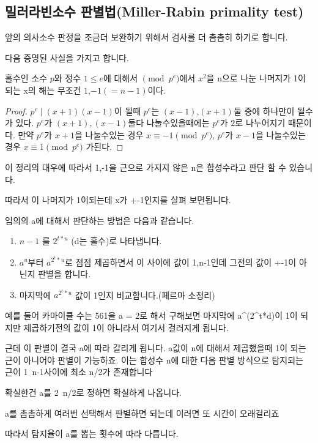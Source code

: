 \subsection{밀러라빈소수 판별법(Miller-Rabin primality test)}

앞의 의사소수 판정을 조금더 보완하기 위해서 검사를 더 촘촘히 하기로 합니다.

다음 증명된 사실을 가지고 합니다.

\begin{theorem}
    홀수인 소수 $p$와 정수 $1 \le e$에 대해서 $\pmod{p^e} $에서 $x^2$을 n으로 나눈 나머지가 1이 되는 x의 해는 무조건 $1$,$-1(=n-1)$이다.
\end{theorem}

\begin{proof}
    $p^e \mid (x+1)(x-1)$이 될때 $p^e$는 $(x-1)$,$(x+1)$둘 중에 하나만이 될수가 있다. $p^e$가 $(x+1), (x-1)$둘다 나눌수있을때에는 $p^e$가 $2$로 나누어지기 때문이다. 만약 $p^e$가 $x+1$을 나눌수있는 경우 $x \equiv -1 \pmod{p^e}$, $p^e$가 $x-1$을 나눌수있는 경우 $x \equiv 1 \pmod{p^e}$ 
    가된다.
\end{proof}
이 정리의 대우에 따라서 1,-1을 근으로 가지지 않은 n은 합성수라고 판단 할 수 있습니다.

따라서 이 나머지가 1이되는데 x가 +-1인지를 살펴 보면됩니다.

임의의 a에 대해서 판단하는 방법은 다음과 같습니다.
\begin{enumerate}
    \item $n-1$ 를  $2^{t*u}$ (d는 홀수)로 나타냅니다.
    \item $a^u$부터 $a^{2^t*u}$로 점점 제곱하면서 이 사이에 값이 1,n-1인데 그전의 값이 +-1이 아닌지 판별을 합니다.
    \item 마지막에 $a^{2^t*u}$ 값이 1인지 비교합니다.(페르마 소정리)
\end{enumerate}

예를 들어 카마이클 수는 561을 a = 2로 해서 구해보면
마지막에 a^(2^t*d)이 1이 되지만 제곱하기전의 값이 1이 아니라서 여기서 걸러지게 됩니다.

근데 이 판별이 결국 a에 따라 갈리게 됩니다. a값이 n에 대해서 제곱했을때 1이 되는 근이 아니어야 판별이 가능하죠. 이는 합성수 n에 대한 다음 판별 방식으로 탐지되는 근이 1~n-1사이에 최소 n/2가 존재합니다

확실한건 a를 2~n/2로 정하면 확실하게 나옵니다.


a를 촘촘하게 여러번 선택해서 판별하면 되는데 이러면 또 시간이 오래걸리죠

따라서 탐지율이 a를 뽑는 횟수에 따라 다릅니다.

